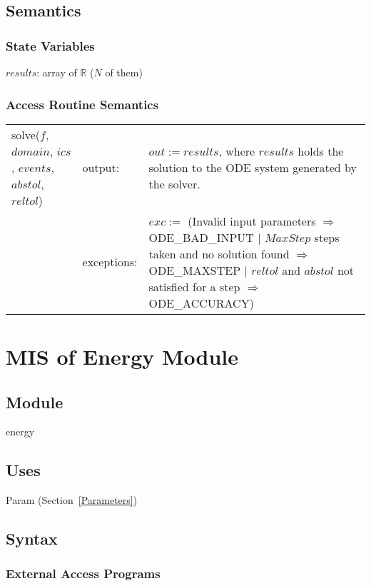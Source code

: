 \documentclass[12pt]{article}
\begin{document}
\subsection{Semantics}

\subsubsection{State Variables}

$results$: array of $\mathbb{R}$ ($N$ of them)

\subsubsection{Access Routine Semantics}

\begin{center}
\begin{tabular}{l l p{5cm}}
solve($f$, $domain$, $ics$, $events$, $abstol$, $reltol$) & output: & $out := results$, where $results$ holds the solution to the ODE system generated by the solver. \\
& exceptions: & $exc :=$ (Invalid input parameters $\Rightarrow$ ODE\_BAD\_INPUT $|$ $MaxStep$ steps taken and no solution found $\Rightarrow$ ODE\_MAXSTEP $|$ $reltol$ and $abstol$ not satisfied for a step $\Rightarrow$ ODE\_ACCURACY)  \\
\end{tabular}
\end{center}

\newpage
\section{MIS of Energy Module} \label{Energy}

\subsection{Module}

energy

\subsection{Uses}

Param (Section~\ref{Parameters})

\subsection{Syntax}

\subsubsection{External Access Programs}
\end{document}
